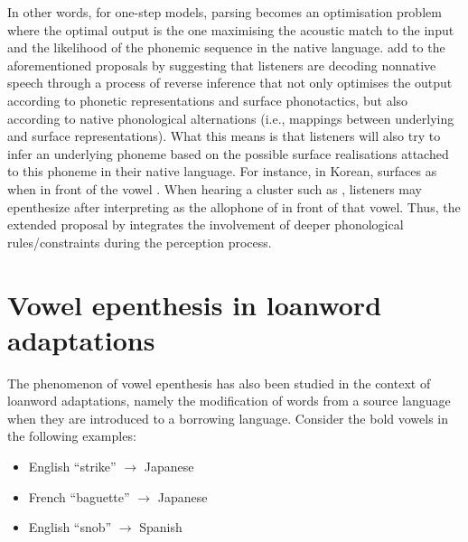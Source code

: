 In other words, for one-step models, parsing becomes an optimisation problem where the optimal output is the one maximising the acoustic match to the input and the likelihood of the phonemic sequence in the native language. \cite{durvasula2015} add to the aforementioned proposals by suggesting that listeners are decoding nonnative speech through a process of reverse inference that not only optimises the output according to phonetic representations and surface phonotactics, but also according to native phonological alternations (i.e., mappings between underlying and surface representations). What this means is that listeners will also try to infer an underlying phoneme based on the possible surface realisations attached to this phoneme in their native language. For instance, in Korean,  surfaces as \textipa{[S]} when in front of the vowel . When hearing a cluster such as \textipa{[Sm]}, listeners may epenthesize \textipa{[i]} after interpreting \textipa{[S]} as the allophone of  in front of that vowel. Thus, the extended proposal by \cite{durvasula2015} integrates the involvement of deeper phonological rules/constraints during the perception process.

\section{Vowel epenthesis in loanword adaptations}
The phenomenon of vowel epenthesis has also been studied in the context of loanword adaptations, namely the modification of words from a source language when they are introduced to a borrowing language. Consider the bold vowels in the following examples:
\begin{itemize}
  \item English ``strike''  $\rightarrow$ Japanese 
  \item French ``baguette''  $\rightarrow$ Japanese  %
  \item English ``snob''  $\rightarrow$ Spanish 
  \end{itemize}
  
